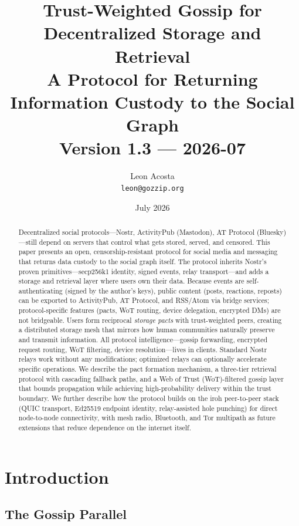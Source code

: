 \documentclass[11pt,a4paper]{article}
\title{
  \textbf{Trust-Weighted Gossip for Decentralized Storage and Retrieval} \\[0.5em]
  \large A Protocol for Returning Information Custody to the Social Graph \\[0.3em]
  \normalsize Version 1.3 --- 2026-07
}
\author{
  Leon Acosta \\
  \texttt{leon@gozzip.org}
}
\date{July 2026}
\begin{document}
\maketitle

\begin{abstract}
Decentralized social protocols---Nostr, ActivityPub (Mastodon), AT Protocol (Bluesky)---still depend on servers that control what gets stored, served, and censored. This paper presents an open, censorship-resistant protocol for social media and messaging that returns data custody to the social graph itself. The protocol inherits Nostr's proven primitives---secp256k1 identity, signed events, relay transport---and adds a storage and retrieval layer where users own their data. Because events are self-authenticating (signed by the author's keys), public content (posts, reactions, reposts) can be exported to ActivityPub, AT Protocol, and RSS/Atom via bridge services; protocol-specific features (pacts, WoT routing, device delegation, encrypted DMs) are not bridgeable.
Users form reciprocal \emph{storage pacts} with trust-weighted peers, creating a distributed storage mesh that mirrors how human communities naturally preserve and transmit information. All protocol intelligence---gossip forwarding, encrypted request routing, WoT filtering, device resolution---lives in clients. Standard Nostr relays work without any modifications; optimized relays can optionally accelerate specific operations. We describe the pact formation mechanism, a three-tier retrieval protocol with cascading fallback paths, and a Web of Trust (WoT)-filtered gossip layer that bounds propagation while achieving high-probability delivery within the trust boundary.
We further describe how the protocol builds on the iroh peer-to-peer stack (QUIC transport, Ed25519 endpoint identity, relay-assisted hole punching) for direct node-to-node connectivity, with mesh radio, Bluetooth, and Tor multipath as future extensions that reduce dependence on the internet itself.
\end{abstract}

\section{Introduction}

\subsection{The Gossip Parallel}
\end{document}
